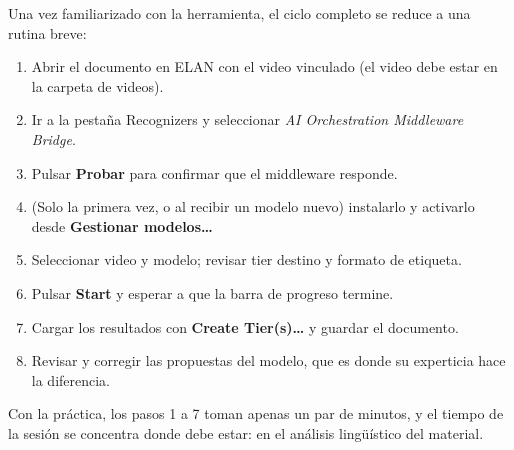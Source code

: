 \documentclass[12pt,a4paper]{article}
\begin{document}
Una vez familiarizado con la herramienta, el ciclo completo se reduce a una rutina breve:

\begin{enumerate}[noitemsep, topsep=2pt]
    \item Abrir el documento en ELAN con el video vinculado (el video debe estar en la carpeta de videos).
    \item Ir a la pestaña Recognizers y seleccionar \textit{AI Orchestration Middleware Bridge}.
    \item Pulsar \textbf{Probar} para confirmar que el middleware responde.
    \item (Solo la primera vez, o al recibir un modelo nuevo) instalarlo y activarlo desde \textbf{Gestionar modelos\ldots}
    \item Seleccionar video y modelo; revisar tier destino y formato de etiqueta.
    \item Pulsar \textbf{Start} y esperar a que la barra de progreso termine.
    \item Cargar los resultados con \textbf{Create Tier(s)\ldots} y guardar el documento.
    \item Revisar y corregir las propuestas del modelo, que es donde su experticia hace la diferencia.
\end{enumerate}

Con la práctica, los pasos 1 a 7 toman apenas un par de minutos, y el tiempo de la sesión se concentra donde debe estar: en el análisis lingüístico del material.
\end{document}
